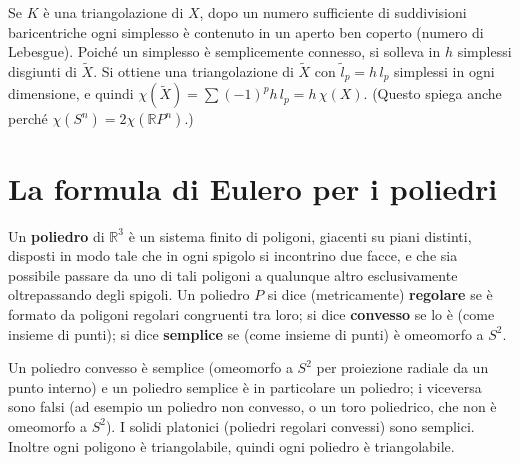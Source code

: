 \begin{observacion}[Idea della dimostrazione di $\chi(\widetilde{X}) = h\,\chi(X)$]
Se $K$ \`e una triangolazione di $X$, dopo un numero sufficiente di suddivisioni baricentriche ogni simplesso \`e contenuto in un aperto ben coperto (numero di Lebesgue). Poich\'e un simplesso \`e semplicemente connesso, si solleva in $h$ simplessi disgiunti di $\widetilde{X}$. Si ottiene una triangolazione di $\widetilde{X}$ con $\widetilde{l}_p = h\, l_p$ simplessi in ogni dimensione, e quindi $\chi(\widetilde{X}) = \sum (-1)^p h\, l_p = h\,\chi(X)$. (Questo spiega anche perch\'e $\chi(S^n) = 2\chi(\mathbb{R}P^n)$.)
\end{observacion}

\section{La formula di Eulero per i poliedri}

\begin{definicion}[Poliedro]
Un \textbf{poliedro} di $\mathbb{R}^3$ \`e un sistema finito di poligoni, giacenti su piani distinti, disposti in modo tale che in ogni spigolo si incontrino due facce, e che sia possibile passare da uno di tali poligoni a qualunque altro esclusivamente oltrepassando degli spigoli. Un poliedro $P$ si dice (metricamente) \textbf{regolare} se \`e formato da poligoni regolari congruenti tra loro; si dice \textbf{convesso} se lo \`e (come insieme di punti); si dice \textbf{semplice} se (come insieme di punti) \`e omeomorfo a $S^2$.
\end{definicion}

\begin{observacion}
Un poliedro convesso \`e semplice (omeomorfo a $S^2$ per proiezione radiale da un punto interno) e un poliedro semplice \`e in particolare un poliedro; i viceversa sono falsi (ad esempio un poliedro non convesso, o un toro poliedrico, che non \`e omeomorfo a $S^2$). I solidi platonici (poliedri regolari convessi) sono semplici. Inoltre ogni poligono \`e triangolabile, quindi ogni poliedro \`e triangolabile.
\end{observacion}

